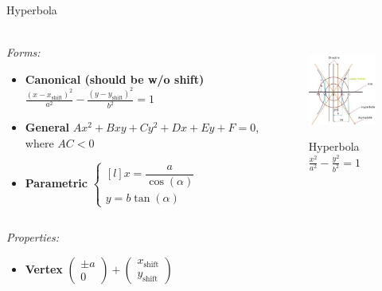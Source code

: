 \documentclass[aspectratio=169]{beamer}
\newcommand{\shf}{\text{shift}}
\begin{document}
    \begin{frame}[t]{Hyperbola}
        \framesubtitle{}
            \scriptsize
            \vspace{-0.4cm}
        \begin{columns}[T,onlytextwidth]
            \begin{column}{0.59\textwidth}
                \textit{Forms:} \\
                \begin{itemize}
                    \item \textbf{Canonical (should be w/o shift)} $\frac{(x-x_{\shf})^2}{a^2}-\frac{(y-y_{\shf})^2}{b^2}=1$
                    \item \textbf{General} $Ax^2+Bxy+Cy^2+Dx+Ey+F=0$, where $AC < 0$
                    \item \textbf{Parametric} $\left\{\begin{matrix*}[l] x = \dfrac{a}{\cos(\alpha)}\\ y = b\tan(\alpha) \end{matrix*}\right.$
                \end{itemize}
            \end{column}
            \begin{column}{0.39\textwidth}
                \vspace{-0.5cm}
                \begin{figure}[H]
                    \centering\includegraphics[height=3cm,width=1\textwidth,keepaspectratio]{Hyperbola.jpg}
                    \vspace{-0.4cm}
                    \caption*{\scriptsize Hyperbola $\frac{x^2}{a^2}-\frac{y^2}{b^2}=1$}
                    \label{fig:Hyperbola.jpg}
                \end{figure}
            \end{column}
        \end{columns}
        \vspace{-0.7cm}
        \textit{Properties:}
        \begin{multicols}{3}
            \begin{itemize}
                \item \textbf{Vertex} $\begin{pmatrix} \pm a\\0 \end{pmatrix} + \begin{pmatrix} x_{\shf}\\y_{\shf} \end{pmatrix}$ 

\end{itemize}
\end{multicols}
\end{frame}
\end{document}
